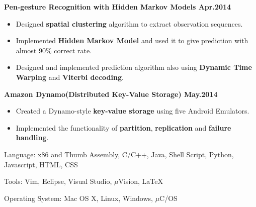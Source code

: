 \documentclass{myres}
\begin{document}
{	\textbf{Pen-gesture Recognition with Hidden Markov Models \hfill Apr.2014}
	\begin{itemize}[topsep=0pt, leftmargin=0.2in] \itemsep -5pt
			\item Designed \textbf{spatial clustering} algorithm to extract observation sequences.
			\item Implemented \textbf{Hidden Markov Model} and used it to give prediction with almost 90\% correct rate.
			\item Designed and implemented prediction algorithm also using \textbf{Dynamic Time Warping} and \textbf{Viterbi decoding}. 
	\end{itemize}	

	\par
	\smallskip

	\textbf{Amazon Dynamo(Distributed Key-Value Storage) \hfill May.2014}
	\begin{itemize}[topsep=0pt, leftmargin=0.2in] \itemsep -5pt
			\item Created a Dynamo-style \textbf{key-value storage} using five Android Emulators.
			\item Implemented the functionality of \textbf{partition}, \textbf{replication} and \textbf{failure handling}.
	\end{itemize}
}
{
	Language: x86 and Thumb Assembly, C/C++, Java, Shell Script, Python, Javascript, HTML, CSS
	\par
	Tools: Vim, Eclipse, Visual Studio, $\mu$Vision, \LaTeX
	\par
	Operating System: Mac OS X, Linux, Windows, $\mu$C/OS
}
%
\end{document}

